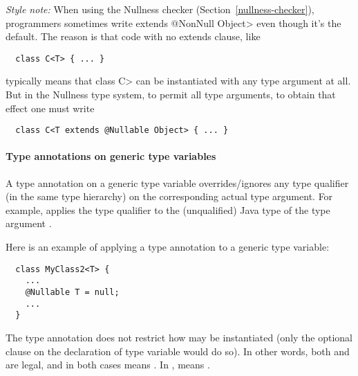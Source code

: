 \emph{Style note:}
When using the Nullness checker (Section~\ref{nullness-checker}),
programmers sometimes write \<extends @NonNull Object> even though it's the 
default.
The reason is that code with no extends clause, like 

\begin{Verbatim}
  class C<T> { ... }
\end{Verbatim}

typically means that class \<C> can be instantiated with any type argument at
all.  But in the Nullness type system, to permit all type arguments, to
obtain that effect one must write

\begin{Verbatim}
  class C<T extends @Nullable Object> { ... }
\end{Verbatim}


\paragraph{Type annotations on generic type variables}

A type annotation on a generic type variable overrides/ignores any type
qualifier (in the same type hierarchy) on the corresponding actual type
argument.  For example,
 applies the type qualifier  to the
(unqualified) Java type of the type argument .

Here is an example of applying a type annotation to a generic type
variable:

\begin{Verbatim}
  class MyClass2<T> {
    ...
    @Nullable T = null;
    ...
  }
\end{Verbatim}

\noindent
The type annotation does not restrict how  may be instantiated
(only the optional  clause on the declaration of type
variable  would do so).  In other words, both 
 and  are
legal, and in both cases  means .
In , 
 means .





